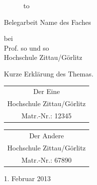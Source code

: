 \begin{titlepage}

\large
\begin{figure}
  \begin{center}
    \hbox to 
  \end{center}
\end{figure}

\begin{center}
\rule{0pt}{0pt}

\begin{huge}
Belegarbeit Name des Faches
\end{huge}
\vspace{.5cm}
\begin{center}
bei\\
\vspace{.5cm}
Prof. so und so \\Hochschule Zittau/Görlitz
\end{center}


\vspace{2cm}

Kurze Erklärung des Themas.\\

\vspace*{2cm}

\begin{tabular}[m]{c}
Der Eine \\Hochschule Zittau/Görlitz\\ Matr.-Nr.: 12345
\end{tabular}
\vspace*{.5cm}

\begin{tabular}[m]{c}
Der Andere \\Hochschule Zittau/Görlitz\\ Matr.-Nr.: 67890
\end{tabular}

\vspace{3cm}

1. Februar 2013

\end{center}
\end{titlepage}
